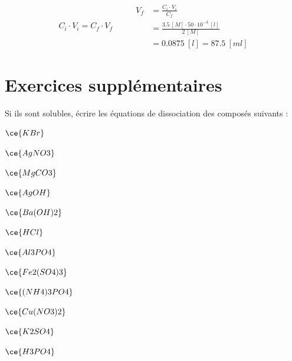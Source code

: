 \documentclass[
  11pt,
  french,
  a4paper,
  openany]{book}
\begin{document}
\begin{Answer}
\[
\begin{split}
  C_i \cdot V_i = C_f \cdot V_f
\end{split}
\qquad
\begin{split}
  V_f &= \frac{C_i \cdot V_i}{C_f} \\
  &= \frac{3.5\ [M] \cdot 50 \cdot 10^{-3}\ [l] }{2\ [M]} \\
  &= 0.0875\ [l] = 87.5\ [ml]
\end{split}
\]

\end{Answer}

\hypertarget{exercices-suppluxe9mentaires-7}{%
\section{Exercices supplémentaires}\label{exercices-suppluxe9mentaires-7}}

\begin{Exercise}

Si ils sont solubles, écrire les équations de dissociation des composés suivants :

\begin{multicols}{2}
\(\ce{KBr}\)

\(\ce{AgNO3}\)

\(\ce{MgCO3}\)

\(\ce{AgOH}\)

\(\ce{Ba(OH)2}\)

\(\ce{HCl}\)

\(\ce{Al3PO4}\)

\(\ce{Fe2(SO4)3}\)

\(\ce{(NH4)3PO4}\)

\(\ce{Cu(NO3)2}\)

\(\ce{K2SO4}\)

\(\ce{H3PO4}\)

\end{multicols}


\end{Exercise}
\end{document}
